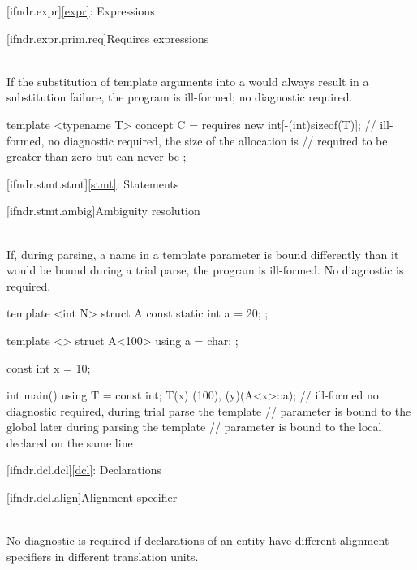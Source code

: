 [ifndr.expr]{\ref{expr}: Expressions}

[ifndr.expr.prim.req]{Requires expressions}

\pnum
{} \\
If the substitution of template arguments into a 
would always result in a substitution failure, the program is ill-formed; no diagnostic required.

\pnum
\begin{example}
\begin{codeblock}
template <typename T> concept C = requires {
  new int[-(int)sizeof(T)]; // ill-formed, no diagnostic required, the size of the allocation is
                            // required to be greater than zero but can never be
};
\end{codeblock}
\end{example}


[ifndr.stmt.stmt]{\ref{stmt}: Statements}

[ifndr.stmt.ambig]{Ambiguity resolution}

\pnum
{} \\
If, during
parsing, a name in a template parameter is bound differently than it would be bound during a trial parse,
the program is ill-formed. No diagnostic is required.

\pnum
\begin{example}
\begin{codeblock}
template <int N> struct A { const static int a = 20; };

template <> struct A<100> { using a = char; };

const int x = 10;

int main() {
  using T = const int;
  T(x)
  (100), (y)(A<x>::a);  // ill-formed no diagnostic required, during trial parse the template
                        // parameter  is bound to the global  later during parsing the template
                        // parameter  is bound to the local  declared on the same line
}
\end{codeblock}
\end{example}


[ifndr.dcl.dcl]{\ref{dcl}: Declarations}

[ifndr.dcl.align]{Alignment specifier}

\pnum
{} \\
No diagnostic is required if declarations of an entity have different alignment-specifiers in different
translation units.

